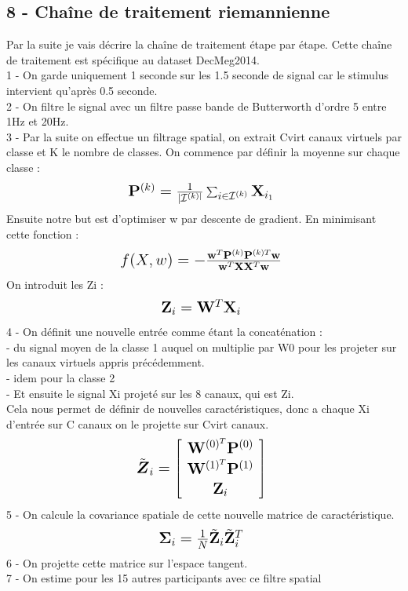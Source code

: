 \documentclass{article}[12pt]
\begin{document}
\subsection{8 - Chaîne de traitement riemannienne}
Par la suite je vais décrire la chaîne de traitement étape par étape. Cette chaîne de traitement est spécifique au dataset DecMeg2014.\\
1 - On garde uniquement 1 seconde sur les 1.5 seconde de signal car le stimulus intervient qu’après 0.5 seconde. \\
2 - On filtre le signal avec un filtre passe bande de Butterworth d'ordre 5 entre 1Hz et 20Hz.\\
3 - Par la suite on effectue un filtrage spatial, on extrait Cvirt canaux virtuels par classe et K le nombre de classes. On commence par définir la moyenne sur chaque classe :
$$ \mbox{\Large $ 
\mathbf{P}^{(k)}=\frac{1}{ | \mathcal{I}^{(k) |}} \sum_{i \in \mathcal{I}^{(k)}} \mathbf{X}_{i_{1}}
$ } $$
Ensuite notre but est d'optimiser w par descente de gradient. En minimisant cette fonction :
$$ \mbox{\Large $ 
f(X,w)=- \frac{\mathbf{w}^{T} \mathbf{P}^{(k)} \mathbf{P}^{(k) T} \mathbf{w}}{\mathbf{w}^{T} \mathbf{X} \mathbf{X}^{T} \mathbf{w}}
$ } $$
On introduit les Zi :
$$ \mbox{\Large $ 
\mathbf{Z}_{i}=\mathbf{W}^{T} \mathbf{X}_{i}
$ } $$
4 - On définit une nouvelle entrée comme étant la concaténation :\\
- du signal moyen de la classe 1 auquel on multiplie par W0 pour les projeter sur les canaux virtuels appris précédemment.\\
- idem pour la classe 2\\
- Et ensuite le signal Xi projeté sur les 8 canaux, qui est Zi.\\
Cela nous permet de définir de nouvelles caractéristiques, donc a chaque Xi d'entrée sur C canaux on le projette sur Cvirt canaux.
$$ \mbox{\Large $ 
\tilde{\boldsymbol{Z}}_{i}=\left[ \begin{array}{c}{\mathbf{W}^{(0)^{T}} \mathbf{P}^{(0)}} \\ {\mathbf{W}^{(1)^{T}} \mathbf{P}^{(1)}} \\ {\mathbf{Z}_{i}}\end{array}\right]
$ } $$
5 - On calcule la covariance spatiale de cette nouvelle matrice de caractéristique.
$$ \mbox{\Large $ 
\boldsymbol{\Sigma}_{i}=\frac{1}{N} \tilde{\mathbf{Z}}_{i} \tilde{\mathbf{Z}}_{i}^{T}
$ } $$
6 - On projette cette matrice sur l'espace tangent.\\
7 - On estime pour les 15 autres participants avec ce filtre spatial\\
\end{document}
